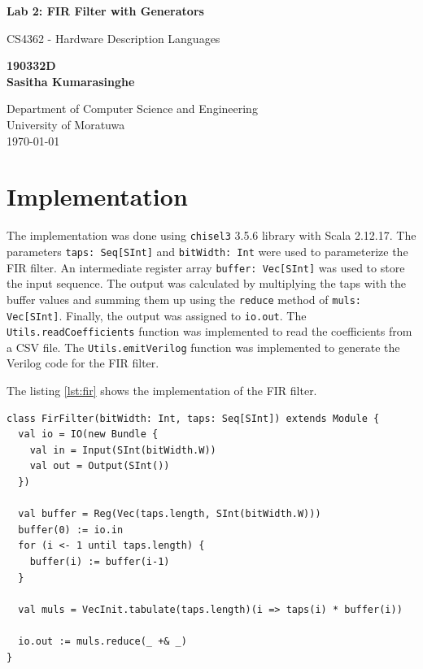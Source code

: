 \documentclass[a4paper,12pt]{article}
\begin{document}
\begin{titlepage}
    \begin{center}
        \vspace*{1cm}
 
        \LARGE
        \textbf{Lab 2: FIR Filter with Generators}
 
        \vspace{0.5cm}

        \large
        CS4362 - Hardware Description Languages
             
        \vspace{1.5cm}
 
        \textbf{190332D\\Sasitha Kumarasinghe}
 
        \vfill
            
        \normalsize
        Department of Computer Science and Engineering\\
        University of Moratuwa\\
        \today
             
    \end{center}
 \end{titlepage}

\section{Implementation}

The implementation was done using \lstinline|chisel3| 3.5.6 library with Scala 2.12.17. The parameters \lstinline|taps: Seq[SInt]| and \lstinline|bitWidth: Int| were used to parameterize the FIR filter. An intermediate register array \lstinline|buffer: Vec[SInt]| was used to store the input sequence. The output was calculated by multiplying the taps with the buffer values and summing them up using the \lstinline|reduce| method of \lstinline|muls: Vec[SInt]|. Finally, the output was assigned to \lstinline|io.out|. The \lstinline|Utils.readCoefficients| function was implemented to read the coefficients from a CSV file. The \lstinline|Utils.emitVerilog| function was implemented to generate the Verilog code for the FIR filter.

\vspace{0.3cm}

\noindent
The listing \ref{lst:fir} shows the implementation of the FIR filter.

\vspace{0.3cm}

\begin{lstlisting}[caption={FIR Filter},captionpos=b,label={lst:fir}]
class FirFilter(bitWidth: Int, taps: Seq[SInt]) extends Module {
  val io = IO(new Bundle {
    val in = Input(SInt(bitWidth.W))
    val out = Output(SInt())
  })

  val buffer = Reg(Vec(taps.length, SInt(bitWidth.W)))
  buffer(0) := io.in
  for (i <- 1 until taps.length) {
    buffer(i) := buffer(i-1)
  }

  val muls = VecInit.tabulate(taps.length)(i => taps(i) * buffer(i))

  io.out := muls.reduce(_ +& _)
}
\end{lstlisting}
\end{document}
